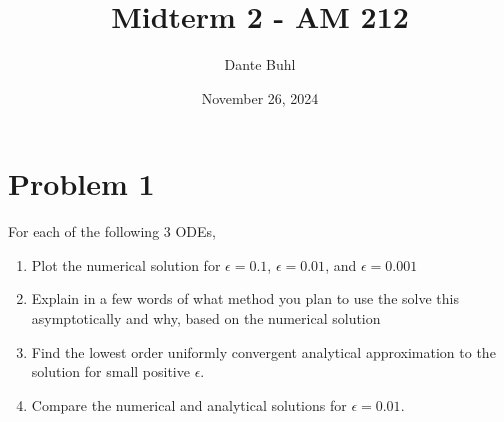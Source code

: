 \documentclass{article}
\begin{document}
\title{Midterm 2 - AM 212}
\author{Dante Buhl}
\date{November 26, 2024}


\newcommand{\wrms}{w_{\text{rms}}}
\newcommand{\bs}[1]{\boldsymbol{#1}}
\newcommand{\tb}[1]{\textbf{#1}}
\newcommand{\bmp}[1]{\begin{minipage}{#1\textwidth}}
\newcommand{\emp}{\end{minipage}}
\newcommand{\R}{\mathbb{R}}
\newcommand{\C}{\mathbb{C}}
\newcommand{\N}{\mathcal{N}}
\newcommand{\K}{\bs{\mathrm{K}}}
\newcommand{\m}{\bs{\mu}_*}
\newcommand{\s}{\bs{\Sigma}_*}
\newcommand{\dt}{\Delta t}
\newcommand{\dx}{\Delta x}
\newcommand{\tr}[1]{\text{Tr}(#1)}
\newcommand{\Tr}[1]{\text{Tr}(#1)}
\newcommand{\Div}{\nabla \cdot}
\renewcommand{\div}{\nabla \cdot}
\newcommand{\Curl}{\nabla \times}
\newcommand{\Grad}{\nabla}
\newcommand{\grad}{\nabla}
\newcommand{\grads}{\nabla_s}
\newcommand{\gradf}{\nabla_f}
\newcommand{\xs}{\bs{x}_s}
\newcommand{\xf}{\bs{x}_f}
\newcommand{\ts}{t_s}
\newcommand{\tf}{t_f}
\newcommand{\pt}{\partial t}
\newcommand{\pz}{\partial z}
\newcommand{\uvec}{\bs{u}}
\newcommand{\F}{\bs{F}}
\newcommand{\T}{\tilde{T}}
\newcommand{\ez}{\bs{e}_z}
\newcommand{\ex}{\bs{e}_x}
\newcommand{\ey}{\bs{e}_y}
\newcommand{\eo}{\bs{e}_{\bs{\Omega}}}
\newcommand{\ppt}[1]{\frac{\partial #1}{\partial t}}
\newcommand{\ppts}[1]{\frac{\partial #1}{\partial t_s}}
\newcommand{\pptf}[1]{\frac{\partial #1}{\partial t_f}}
\newcommand{\ppz}[1]{\frac{\partial #1}{\partial z}}
\newcommand{\ddz}[1]{\frac{d #1}{d z}}
\newcommand{\ppzetas}[1]{\frac{\partial^2 #1}{\partial \zeta^2}}
\newcommand{\ppzs}[1]{\frac{\partial #1}{\partial z_s}}
\newcommand{\ppzf}[1]{\frac{\partial #1}{\partial z_f}}
\newcommand{\ppx}[1]{\frac{\partial #1}{\partial x}}
\newcommand{\ppy}[1]{\frac{\partial #1}{\partial y}}
\newcommand{\ppzeta}[1]{\frac{\partial #1}{\partial \zeta}}


\maketitle 

\section*{Problem 1}
For each of the following 3 ODEs,
\begin{enumerate}[label=\alph*.]
    \item Plot the numerical solution for $\epsilon = 0.1$, $\epsilon = 0.01$,
    and $\epsilon = 0.001$
    \item Explain in a few words of what method you plan to use the solve this
    asymptotically and why, based on the numerical solution
    \item Find the lowest order uniformly convergent analytical approximation to
    the solution for small positive $\epsilon$. 
    \item Compare the numerical and analytical solutions for $\epsilon = 0.01$. 
\end{enumerate}
\end{document}

